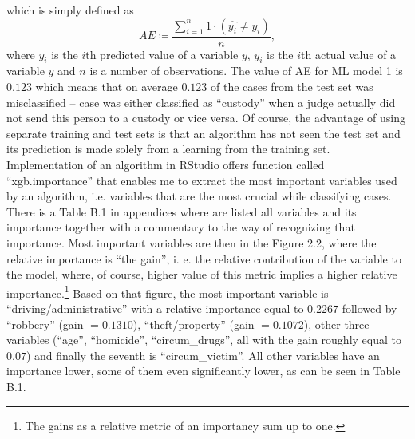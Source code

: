 \documentclass[12pt, twoside,openany]{book} %
\begin{document}
which is simply defined as\newline
\begin{equation}
AE \coloneqq \frac{\sum_{i=1}^n 1\cdot (\hat{y_i} \neq y_i)}{n}, 
\end{equation}\newline
where $\hat{y_i}$ is the $i$th predicted value of a variable $y$, $y_i$ is the $i$th actual value of a variable $y$ and $n$ is a number of observations. The value of AE for ML model 1 is $0.123$ which means that on average $0.123$ of the cases from the test set was misclassified – case was either classified as “custody” when a judge actually did not send this person to a custody or vice versa. Of course, the advantage of using separate training and test sets is that an algorithm has not seen the test set and its prediction is made solely from a learning from the training set.\newline 
Implementation of an algorithm in RStudio offers function called “xgb.importance” that enables me to extract the most important variables used by an algorithm, i.e. variables that are the most crucial while classifying cases. There is a Table B.1 in appendices where are listed all variables and its importance together with a commentary to the way of recognizing that importance. Most important variables are then in the Figure 2.2, where the relative importance is “the gain”, i. e. the relative contribution of the variable to the model, where, of course, higher value of this metric implies a higher relative importance.\footnote{The gains as a relative metric of an importancy sum up to one.} Based on that figure, the most important variable is “driving/administrative” with a relative importance equal to $0.2267$ followed by “robbery” (gain $ = 0.1310$), “theft/property” (gain $ = 0.1072$), other three variables (“age”, “homicide”, “circum\_drugs”, all with the gain roughly equal to $0.07$) and finally the seventh is “circum\_victim”. All other variables have an importance lower, some of them even significantly lower, as can be seen in Table B.1.
\end{document}
